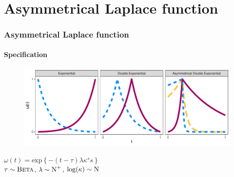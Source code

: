 \documentclass[handout]{snedecorbeamer}
\begin{document}


\section{Asymmetrical Laplace function}

\begin{frame}
  \frametitle{Asymmetrical Laplace function}
  \framesubtitle{Specification}

  \begin{figure}[h!]
	\centering
    \includegraphics[width=.7\textwidth]{02-alf-weight-plot}%
  \end{figure}
  \begin{center}
    $\omega(t) = \text{exp}\left\{-(t - \tau) \lambda \kappa^s s\right\}$\\
    $\tau \sim \textsc{Beta}$,
    $\lambda \sim \textsc{N}^{+}$,
    $\log(\kappa) \sim \textsc{N}$
  \end{center}

  \blankfootnote{
    $\omega(t): \mathcal{T} = [0, 1] \to (0, 1]$,
    $s = \text{sign}(t - \tau)$,
    $\tau > 0$,
    $\lambda > 0$,
    $\kappa > 0$
  }
\end{frame}
\end{document}
